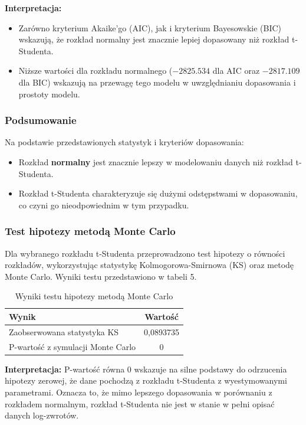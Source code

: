 \documentclass[a4paper,11pt]{article}
\begin{document}
\textbf{Interpretacja:}
\begin{itemize}
    \item Zarówno kryterium Akaike'go (AIC), jak i kryterium Bayesowskie (BIC) wskazują, że rozkład normalny jest znacznie lepiej dopasowany niż rozkład t-Studenta.
    \item Niższe wartości dla rozkładu normalnego ($-2825.534$ dla AIC oraz $-2817.109$ dla BIC) wskazują na przewagę tego modelu w uwzględnianiu dopasowania i prostoty modelu.
\end{itemize}

\subsubsection*{Podsumowanie}

Na podstawie przedstawionych statystyk i kryteriów dopasowania:
\begin{itemize}
    \item Rozkład \textbf{normalny} jest znacznie lepszy w modelowaniu danych niż rozkład t-Studenta.
    \item Rozkład t-Studenta charakteryzuje się dużymi odstępstwami w dopasowaniu, co czyni go nieodpowiednim w tym przypadku.
\end{itemize}



\newpage\subsubsection{Test hipotezy metodą Monte Carlo}

Dla wybranego rozkładu t-Studenta przeprowadzono test hipotezy o równości rozkładów, wykorzystując statystykę Kolmogorowa-Smirnowa (KS) oraz metodę Monte Carlo. Wyniki testu przedstawiono w tabeli 5.

\begin{table}[H]
    \centering
    \begin{tabular}{|p{7cm}|c|}
        \hline
        \textbf{Wynik} & \textbf{Wartość} \\
        \hline
        Zaobserwowana statystyka KS & 0,0893735 \\
        P-wartość z symulacji Monte Carlo & 0 \\
        \hline
    \end{tabular}
    \caption{Wyniki testu hipotezy metodą Monte Carlo}
    \label{tab:test_results}
\end{table}


\textbf{Interpretacja:} P-wartość równa 0 wskazuje na silne podstawy do odrzucenia hipotezy zerowej, że dane pochodzą z rozkładu t-Studenta z wyestymowanymi parametrami. Oznacza to, że mimo lepszego dopasowania w porównaniu z rozkładem normalnym, rozkład t-Studenta nie jest w stanie w pełni opisać danych log-zwrotów.
\end{document}
